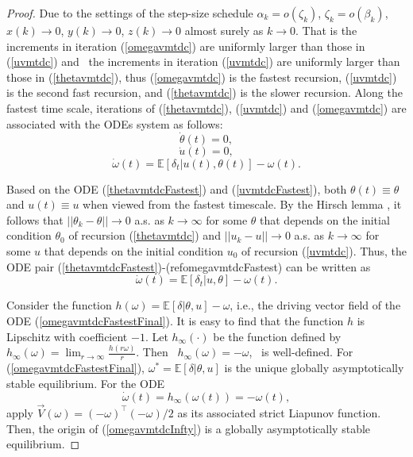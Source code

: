 \begin{proof}
Due to the settings of the step-size schedule 
$\alpha_k = o(\zeta_k)$, $\zeta_k = o(\beta_k)$, ${x}(k)\rightarrow 0$, ${y}(k)\rightarrow 0$, $z(k)\rightarrow 0$ almost surely as $k\rightarrow 0$.
That is the increments in iteration (\ref{omegavmtdc}) are uniformly larger than
those in (\ref{uvmtdc}) and  the increments in iteration (\ref{uvmtdc}) are uniformly larger than
those in (\ref{thetavmtdc}), thus (\ref{omegavmtdc}) is the fastest recursion, (\ref{uvmtdc}) is the second fast recursion, and (\ref{thetavmtdc}) is the slower recursion.
Along the fastest time scale, iterations of (\ref{thetavmtdc}), (\ref{uvmtdc}) and (\ref{omegavmtdc})
are associated with the ODEs system as follows:
\begin{equation}
 \dot{{\theta}}(t) = 0,
    \label{thetavmtdcFastest}
\end{equation}
\begin{equation}
 \dot{{u}}(t) = 0,
    \label{uvmtdcFastest}
\end{equation}
\begin{equation}
 \dot{\omega}(t)=\mathbb{E}[\delta_t|{u}(t),{\theta}(t)]-\omega(t).
    \label{omegavmtdcFastest}
\end{equation}

Based on the ODE (\ref{thetavmtdcFastest}) and (\ref{uvmtdcFastest}), both ${\theta}(t)\equiv {\theta}$
and ${u}(t)\equiv {u}$ when viewed from the fastest timescale.
By the Hirsch lemma \cite{hirsch1989convergent}, it follows that
$||{\theta}_k-{\theta}||\rightarrow 0$ a.s. as $k\rightarrow \infty$ for some
${\theta}$ that depends on the initial condition ${\theta}_0$ of recursion
(\ref{thetavmtdc}) and $||{u}_k-{u}||\rightarrow 0$ a.s. as $k\rightarrow \infty$ for some
$u$ that depends on the initial condition $u_0$ of recursion
(\ref{uvmtdc}). Thus, the ODE pair (\ref{thetavmtdcFastest})-(ref{omegavmtdcFastest})
can be written as 
\begin{equation}
 \dot{\omega}(t)=\mathbb{E}[\delta_t|{u},{\theta}]-\omega(t).
    \label{omegavmtdcFastestFinal}
\end{equation}

Consider the function $h(\omega)=\mathbb{E}[\delta|{\theta},{u}]-\omega$,
i.e., the driving vector field of the ODE (\ref{omegavmtdcFastestFinal}).
It is easy to find that the function $h$ is Lipschitz with coefficient
$-1$.
Let $h_{\infty}(\cdot)$ be the function defined by
 $h_{\infty}(\omega)=\lim_{r\rightarrow \infty}\frac{h(r\omega)}{r}$.
 Then  $h_{\infty}(\omega)= -\omega$,  is well-defined. 
 For (\ref{omegavmtdcFastestFinal}), $\omega^*=\mathbb{E}[\delta|{\theta},{u}]$
is the unique globally asymptotically stable equilibrium.
For the ODE
\begin{equation}
 \dot{\omega}(t) = h_{\infty}(\omega(t))= -\omega(t),
 \label{omegavmtdcInfty}
\end{equation}
apply $\vec{V}(\omega)=(-\omega)^{\top}(-\omega)/2$ as its
associated strict Liapunov function. Then,
the origin of (\ref{omegavmtdcInfty}) is a globally asymptotically stable
equilibrium.


\end{proof}
